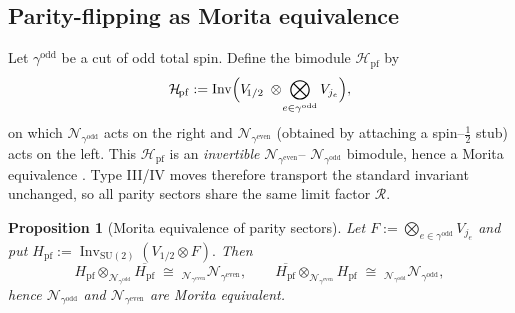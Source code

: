 \documentclass[11pt]{article}
\newtheorem{proposition}{Proposition}[section]
\begin{document}
\subsection*{Parity-flipping as Morita equivalence}

Let $\gamma^{\mathrm{odd}}$ be a cut of odd total spin.
Define the bimodule $\mathcal{H}_{\!\mathrm{pf}}$ by
\[
  \mathcal{H}_{\!\mathrm{pf}}
  :=\operatorname{Inv}\Bigl(
      V_{\!1/2}\;\otimes\!
      \bigotimes_{e\in\gamma^{\mathrm{odd}}}V_{j_e}
    \Bigr),
\]
on which
$\mathcal N_{\gamma^{\mathrm{odd}}}$ acts on the right and
$\mathcal N_{\gamma^{\mathrm{even}}}$ (obtained by attaching a spin–$\frac12$
stub) acts on the left.  This $\mathcal H_{\!\mathrm{pf}}$ is an
\emph{invertible} $\mathcal N_{\gamma^{\mathrm{even}}}$–%
$\mathcal N_{\gamma^{\mathrm{odd}}}$ bimodule, hence a Morita equivalence
\cite[Def.~2.1]{PopaCBMS}.  Type III/IV moves therefore transport the standard
invariant unchanged, so all parity sectors share the same limit factor
$\mathcal R$.

\begin{proposition}[Morita equivalence of parity sectors]\label{prop:Morita}
Let
\(
   F:=\bigotimes_{e\in\gamma^{\mathrm{odd}}} V_{j_e}
\)
and put
\(
   H_{\mathrm{pf}}
   :=\operatorname{Inv}_{\mathrm{SU}(2)}(V_{1/2}\!\otimes\!F).
\)
Then
\[
  H_{\mathrm{pf}}\!\otimes_{\mathcal N_{\gamma^{\mathrm{odd}}}}
  \overline{H_{\mathrm{pf}}}
  \;\cong\;
  {}_{\mathcal N_{\gamma^{\mathrm{even}}}}\mathcal N_{\gamma^{\mathrm{even}}},
  \qquad
  \overline{H_{\mathrm{pf}}}\!\otimes_{\mathcal N_{\gamma^{\mathrm{even}}}}
  H_{\mathrm{pf}}
  \;\cong\;
  {}_{\mathcal N_{\gamma^{\mathrm{odd}}}}\mathcal N_{\gamma^{\mathrm{odd}}},
\]
hence $\mathcal N_{\gamma^{\mathrm{odd}}}$ and
$\mathcal N_{\gamma^{\mathrm{even}}}$ are Morita equivalent.
\end{proposition}
\end{document}
